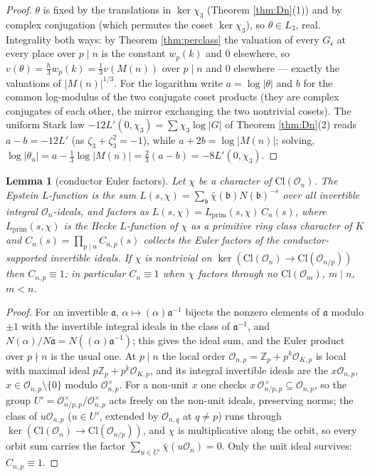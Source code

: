 \documentclass[11pt]{amsart}
\numberwithin{equation}{section}
\theoremstyle{plain}
\newtheorem{lemma}[theorem]{Lemma}
\theoremstyle{definition}
\theoremstyle{remark}
\newcommand{\Z}{\mathbb{Z}}
\newcommand{\Cl}{\mathrm{Cl}}
\newcommand{\ideala}{\mathfrak{a}}
\newcommand{\idealb}{\mathfrak{b}}
\newcommand{\idealc}{\mathfrak{c}}
\newcommand{\Lprim}{L_{\mathrm{prim}}}
\newcommand{\Oc}{\mathcal{O}}
\begin{document}
\begin{proof}
$\theta$ is fixed by the translations in $\ker\chi_3$ (Theorem
\ref{thm:Dn}(1)) and by complex conjugation (which permutes the coset
$\ker\chi_3$), so $\theta \in L_3$, real.  Integrality both ways: by
Theorem \ref{thm:perclass} the valuation of every $G_\idealc$ at every
place over $p \mid n$ is the constant $w_p(k)$ and $0$ elsewhere, so
$v(\theta) = \tfrac h3w_p(k) = \tfrac13v(M(n))$ over $p \mid n$ and $0$
elsewhere --- exactly the valuations of $|M(n)|^{1/3}$.  For the
logarithm write $a = \log|\theta|$ and $b$ for the common log-modulus of
the two conjugate coset products (they are complex conjugates of each
other, the mirror exchanging the two nontrivial cosets).  The uniform
Stark law $-12L'(0,\chi_3) = \sum\chi_3\log|G|$ of Theorem
\ref{thm:Dn}(2) reads $a - b = -12L'$ (as $\zeta_3 + \zeta_3^2 = -1$),
while $a + 2b = \log|M(n)|$; solving, $\log|\theta_u| = a -
\tfrac13\log|M(n)| = \tfrac23(a - b) = -8L'(0,\chi_3)$.
\end{proof}

\begin{lemma}[conductor Euler factors]\label{lem:conductor}
Let $\chi$ be a character of $\Cl(\Oc_n)$.  The Epstein $L$-function is
the sum $L(s,\chi) = \sum_\idealb\bar\chi(\idealb)N(\idealb)^{-s}$ over all
invertible integral $\Oc_n$-ideals, and factors as $L(s,\chi) =
\Lprim(s,\chi)\,C_n(s)$, where $\Lprim(s,\chi)$ is the Hecke $L$-function
of $\chi$ as a primitive ring class character of $K$ and $C_n(s) =
\prod_{p \mid n}C_{n,p}(s)$ collects the Euler factors of the
conductor-supported invertible ideals.  If $\chi$ is nontrivial on
$\ker(\Cl(\Oc_n) \to \Cl(\Oc_{n/p}))$ then $C_{n,p} \equiv 1$; in
particular $C_n \equiv 1$ when $\chi$ factors through no $\Cl(\Oc_m)$,
$m \mid n$, $m < n$.
\end{lemma}

\begin{proof}
For an invertible $\ideala$, $\alpha \mapsto (\alpha)\ideala^{-1}$
bijects the nonzero elements of $\ideala$ modulo $\pm1$ with the
invertible integral ideals in the class of $\ideala^{-1}$, and
$N(\alpha)/N\ideala = N((\alpha)\ideala^{-1})$; this gives the ideal sum,
and the Euler product over $p \nmid n$ is the usual one.  At $p \mid n$
the local order $\Oc_{n,p} = \Z_p + p^k\Oc_{K,p}$ is local with maximal
ideal $p\Z_p + p^k\Oc_{K,p}$, and its integral invertible ideals are the
$x\Oc_{n,p}$, $x \in \Oc_{n,p}\setminus\{0\}$ modulo $\Oc_{n,p}^\times$.
For a non-unit $x$ one checks $x\,\Oc_{n/p,p}^\times \subseteq \Oc_{n,p}$,
so the group $U' = \Oc_{n/p,p}^\times/\Oc_{n,p}^\times$ acts freely on
the non-unit ideals, preserving norms; the class of $u\Oc_{n,p}$ ($u \in
U'$, extended by $\Oc_{n,q}$ at $q \ne p$) runs through $\ker(\Cl(\Oc_n)
\to \Cl(\Oc_{n/p}))$, and $\chi$ is multiplicative along the orbit, so
every orbit sum carries the factor $\sum_{u \in U'}\bar\chi(u\Oc_n) = 0$.
Only the unit ideal survives: $C_{n,p} \equiv 1$.
\end{proof}
\end{document}

